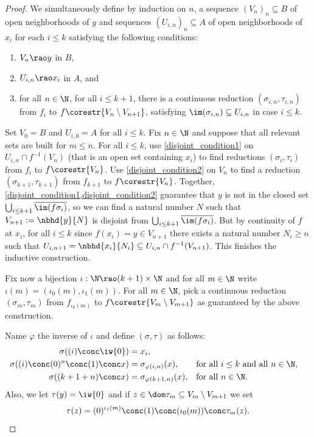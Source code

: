 \begin{proof} We simultaneously define by induction on $n$, a sequence $(V_n)_n\subseteq B$ of open neighborhoods of $y$ and sequences $(U_{i,n})_n\subseteq A$ of open neighborhoods of $x_i$ for each $i\leq k$ satisfying the following conditions:
\begin{enumerate}[label=\arabic*)]
\item $V_n\rao y$ in $B$,
\item $U_{i,n}\rao x_i$ in $A$, and
\item  for all $n\in\N$, for all $i\leq k+1$, there is a continuous reduction $(\sigma_{i,n},\tau_{i,n})$ from $f_i$ to $f\corestr{V_n\setminus V_{n+1}}$,
satisfying $\im(\sigma_{i,n})\subseteq U_{i,n}$ in case $i\leq k$.
\end{enumerate}

Set $V_0=B$ and $U_{i,0}=A$ for all $i\leq k$.
Fix $n\in\N$ and suppose that all relevant sets are built for $m\leq n$.
For all $i\leq k$, use \cref{disjoint_condition1} on $U_{i,n}\cap f^{-1}(V_n)$ (that is an open set containing $x_i$) to find reductions $(\sigma_i,\tau_i)$ from $f_i$ to $f\corestr{V_n}$.
Use \cref{disjoint_condition2} on $V_n$ to find a reduction $(\sigma_{k+1},\tau_{k+1})$ from $f_{k+1}$ to $f\corestr{V_n}$.
Together, \cref{disjoint_condition1,disjoint_condition2} guarantee that $y$ is not in the closed set $\bigcup_{i\leq k+1}\overline{\im(f\sigma_i)}$, so
we can find a natural number $N$ such that $V_{n+1}:=\nbhd{y}{N}$ is disjoint from $\bigcup_{i\leq k+1}\overline{\im(f\sigma_i)}$.
But by continuity of $f$ at $x_i$, for all $i\leq k$ since $f(x_i)=y\in V_{n+1}$ there exists a natural number $N_i\geq n$ such that $U_{i,n+1}=\nbhd{x_i}{N_i}\subseteq U_{i,n}\cap f^{-1}(V_{n+1})$.
This finishes the inductive construction.

Fix now a bijection $\iota:\N\rao(k+1)\times\N$ and for all $m\in\N$ write $\iota(m)=(\iota_0(m),\iota_1(m))$. For all $m\in\N$,
pick a continuous reduction $(\sigma_{m},\tau_{m})$ from $f_{\iota_0(m)}$ to $f\corestr{V_{m}\setminus V_{m+1}}$ as guaranteed by the above construction.

Name $\varphi$ the inverse of $\iota$ and define $(\sigma,\tau)$ as follows:
\begin{align*}
\sigma((i)\conc\iw{0})&=x_i, \\
\sigma((i)\conc(0)^n\conc(1)\conc x)&=\sigma_{\varphi(i,n)}(x), &&\text{for all $i\leq k$ and all $n\in\N$},\\
\sigma((k+1+n)\conc x)&=\sigma_{\varphi(k+1,n)}(x), &&\text{for all $n\in\N$}.
\end{align*}
Also, we let $\tau(y)=\iw{0}$ and if $z\in \dom \tau_m \subseteq V_m\setminus V_{m+1}$
we set 
\[
\tau(z)=(0)^{\iota_1(m)}\conc (1)\conc (\iota_0(m))\conc \tau_m(z).
\]


\end{proof}
